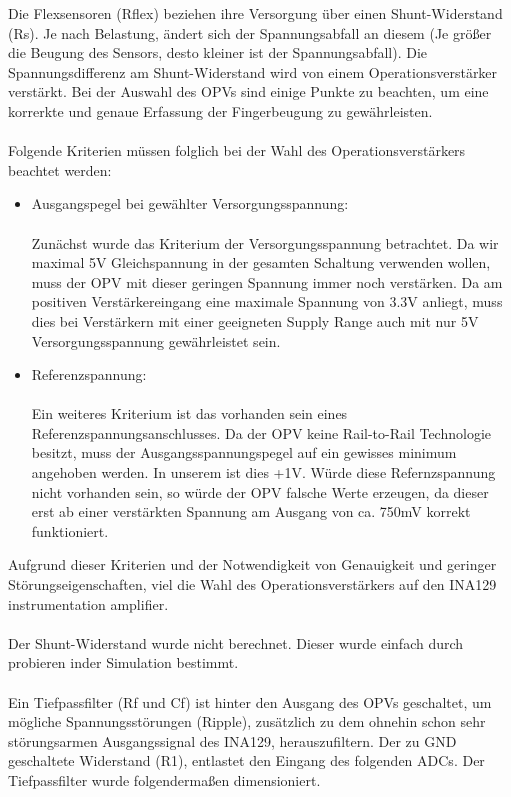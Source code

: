 \documentclass[titlepage,12pt,twoside]{article}
\begin{document}
Die Flexsensoren (Rflex) beziehen ihre Versorgung über einen Shunt-Widerstand (Rs). Je nach Belastung, ändert sich der 
Spannungsabfall an diesem (Je größer die Beugung des Sensors, desto kleiner ist der Spannungsabfall). Die Spannungsdifferenz 
am Shunt-Widerstand wird von einem Operationsverstärker verstärkt. Bei der Auswahl des OPVs sind einige Punkte zu beachten, um 
eine korrerkte und genaue Erfassung der Fingerbeugung zu gewährleisten. \\
\\
Folgende Kriterien müssen folglich bei der Wahl des Operationsverstärkers beachtet werden:
\begin{itemize}
	\item Ausgangspegel bei gewählter Versorgungsspannung: \\
		  \\
		  Zunächst wurde das Kriterium der Versorgungsspannung betrachtet. Da wir maximal 5V Gleichspannung in der gesamten 
		  Schaltung verwenden wollen, muss der OPV mit dieser geringen Spannung immer noch verstärken. Da am positiven 
		  Verstärkereingang eine maximale Spannung von 3.3V anliegt, muss dies bei Verstärkern mit einer geeigneten Supply Range 
		  auch mit nur 5V Versorgungsspannung gewährleistet sein.
	\item Referenzspannung: \\
		  \\
		  Ein weiteres Kriterium ist das vorhanden sein eines Referenzspannungsanschlusses. Da der OPV keine Rail-to-Rail 
		  Technologie besitzt, muss der Ausgangsspannungspegel auf ein gewisses minimum angehoben werden. In unserem ist dies 
		  +1V. Würde diese Refernzspannung nicht vorhanden sein, so würde der OPV falsche Werte erzeugen, da dieser erst ab einer
		  verstärkten Spannung am Ausgang von ca. 750mV korrekt funktioniert.

\end{itemize}
Aufgrund dieser Kriterien und der Notwendigkeit von Genauigkeit und geringer Störungseigenschaften, viel die Wahl des 
Operationsverstärkers auf den INA129 instrumentation amplifier. \\
\\
Der Shunt-Widerstand wurde nicht berechnet. Dieser wurde einfach durch probieren inder Simulation bestimmt. \\
\\
Ein Tiefpassfilter (Rf und Cf) ist hinter den Ausgang des OPVs geschaltet, um mögliche Spannungsstörungen (Ripple), zusätzlich
zu dem ohnehin schon sehr störungsarmen Ausgangssignal des INA129, herauszufiltern. Der zu GND geschaltete Widerstand (R1), 
entlastet den Eingang des folgenden ADCs. Der Tiefpassfilter wurde folgendermaßen dimensioniert. \\
\\
\end{document}
